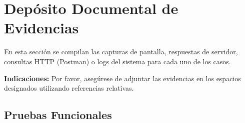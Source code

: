 \section{Depósito Documental de Evidencias}
\label{sec:evidencias}

En esta sección se compilan las capturas de pantalla, respuestas de servidor, consultas HTTP (Postman) o logs del sistema para cada uno de los casos. 

\textbf{Indicaciones:} Por favor, asegúrese de adjuntar las evidencias en los espacios designados utilizando referencias relativas.

\subsection{Pruebas Funcionales}

